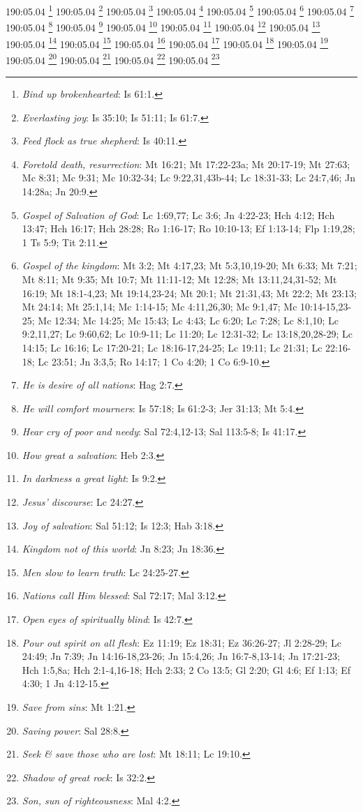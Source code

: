 190:05.04 \footnote{\textit{Bind up brokenhearted}: Is 61:1.}
190:05.04 \footnote{\textit{Everlasting joy}: Is 35:10; Is 51:11; Is 61:7.}
190:05.04 \footnote{\textit{Feed flock as true shepherd}: Is 40:11.}
190:05.04 \footnote{\textit{Foretold death, resurrection}: Mt 16:21; Mt 17:22-23a; Mt 20:17-19; Mt 27:63; Mc 8:31; Mc 9:31; Mc 10:32-34; Lc 9:22,31,43b-44; Lc 18:31-33; Lc 24:7,46; Jn 14:28a; Jn 20:9.}
190:05.04 \footnote{\textit{Gospel of Salvation of God}: Lc 1:69,77; Lc 3:6; Jn 4:22-23; Hch 4:12; Hch 13:47; Hch 16:17; Hch 28:28; Ro 1:16-17; Ro 10:10-13; Ef 1:13-14; Flp 1:19,28; 1 Ts 5:9; Tit 2:11.}
190:05.04 \footnote{\textit{Gospel of the kingdom}: Mt 3:2; Mt 4:17,23; Mt 5:3,10,19-20; Mt 6:33; Mt 7:21; Mt 8:11; Mt 9:35; Mt 10:7; Mt 11:11-12; Mt 12:28; Mt 13:11,24,31-52; Mt 16:19; Mt 18:1-4,23; Mt 19:14,23-24; Mt 20:1; Mt 21:31,43; Mt 22:2; Mt 23:13; Mt 24:14; Mt 25:1,14; Mc 1:14-15; Mc 4:11,26,30; Mc 9:1,47; Mc 10:14-15,23-25; Mc 12:34; Mc 14:25; Mc 15:43; Lc 4:43; Lc 6:20; Lc 7:28; Lc 8:1,10; Lc 9:2,11,27; Lc 9:60,62; Lc 10:9-11; Lc 11:20; Lc 12:31-32; Lc 13:18,20,28-29; Lc 14:15; Lc 16:16; Lc 17:20-21; Lc 18:16-17,24-25; Lc 19:11; Lc 21:31; Lc 22:16-18; Lc 23:51; Jn 3:3,5; Ro 14:17; 1 Co 4:20; 1 Co 6:9-10.}
190:05.04 \footnote{\textit{He is desire of all nations}: Hag 2:7.}
190:05.04 \footnote{\textit{He will comfort mourners}: Is 57:18; Is 61:2-3; Jer 31:13; Mt 5:4.}
190:05.04 \footnote{\textit{Hear cry of poor and needy}: Sal 72:4,12-13; Sal 113:5-8; Is 41:17.}
190:05.04 \footnote{\textit{How great a salvation}: Heb 2:3.}
190:05.04 \footnote{\textit{In darkness a great light}: Is 9:2.}
190:05.04 \footnote{\textit{Jesus' discourse}: Lc 24:27.}
190:05.04 \footnote{\textit{Joy of salvation}: Sal 51:12; Is 12:3; Hab 3:18.}
190:05.04 \footnote{\textit{Kingdom not of this world}: Jn 8:23; Jn 18:36.}
190:05.04 \footnote{\textit{Men slow to learn truth}: Lc 24:25-27.}
190:05.04 \footnote{\textit{Nations call Him blessed}: Sal 72:17; Mal 3:12.}
190:05.04 \footnote{\textit{Open eyes of spiritually blind}: Is 42:7.}
190:05.04 \footnote{\textit{Pour out spirit on all flesh}: Ez 11:19; Ez 18:31; Ez 36:26-27; Jl 2:28-29; Lc 24:49; Jn 7:39; Jn 14:16-18,23-26; Jn 15:4,26; Jn 16:7-8,13-14; Jn 17:21-23; Hch 1:5,8a; Hch 2:1-4,16-18; Hch 2:33; 2 Co 13:5; Gl 2:20; Gl 4:6; Ef 1:13; Ef 4:30; 1 Jn 4:12-15.}
190:05.04 \footnote{\textit{Save from sins}: Mt 1:21.}
190:05.04 \footnote{\textit{Saving power}: Sal 28:8.}
190:05.04 \footnote{\textit{Seek & save those who are lost}: Mt 18:11; Lc 19:10.}
190:05.04 \footnote{\textit{Shadow of great rock}: Is 32:2.}
190:05.04 \footnote{\textit{Son, sun of righteousness}: Mal 4:2.}
